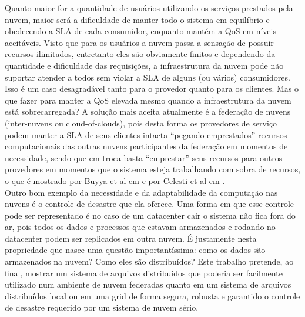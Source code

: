 Quanto maior for a quantidade de usuários utilizando os serviços prestados pela nuvem, maior será a dificuldade de manter todo o sistema em equilíbrio e obedecendo a SLA de cada consumidor, enquanto mantém a QoS em níveis aceitáveis. Visto que para os usuários a nuvem passa a sensação de possuir recursos ilimitados, entretanto eles são obviamente finitos e dependendo da quantidade e dificuldade das requisições, a infraestrutura da nuvem pode não suportar atender a todos sem violar a SLA de alguns (ou vários) consumidores. Isso é um caso desagradável tanto para o provedor quanto para os clientes. Mas o que fazer para manter a QoS elevada mesmo quando a infraestrutura da nuvem está sobrecarregada? A solução mais aceita atualmente é a federação de nuvens (inter-nuvens ou cloud-of-clouds), pois desta forma os provedores de serviço podem manter a SLA de seus clientes intacta “pegando emprestados” recursos computacionais das outras nuvens participantes da federação em momentos de necessidade, sendo que em troca basta “emprestar” seus recursos para outros provedores em momentos que o sistema esteja trabalhando com sobra de recursos, o que é mostrado por Buyya et al em \cite{buyya2} e por Celesti et al em \cite{celesti1}.\\

Outro bom exemplo da necessidade e da adaptabilidade da computação nas nuvens é o controle de desastre que ela oferece. Uma forma em que esse controle pode ser representado é no caso de um datacenter cair o sistema não fica fora do ar, pois todos os dados e processos que estavam armazenados e rodando no datacenter podem ser replicados em outra nuvem. É justamente nesta propriedade que nasce uma questão importantíssima: como os dados são armazenados na nuvem? Como eles são distribuídos? Este trabalho pretende, ao final, mostrar um sistema de arquivos distribuídos que poderia ser facilmente utilizado num ambiente de nuvem federadas quanto em um sistema de arquivos distribuídos local ou em uma grid de forma segura, robusta e garantido o controle de desastre requerido por um sistema de nuvem sério.\\
	
